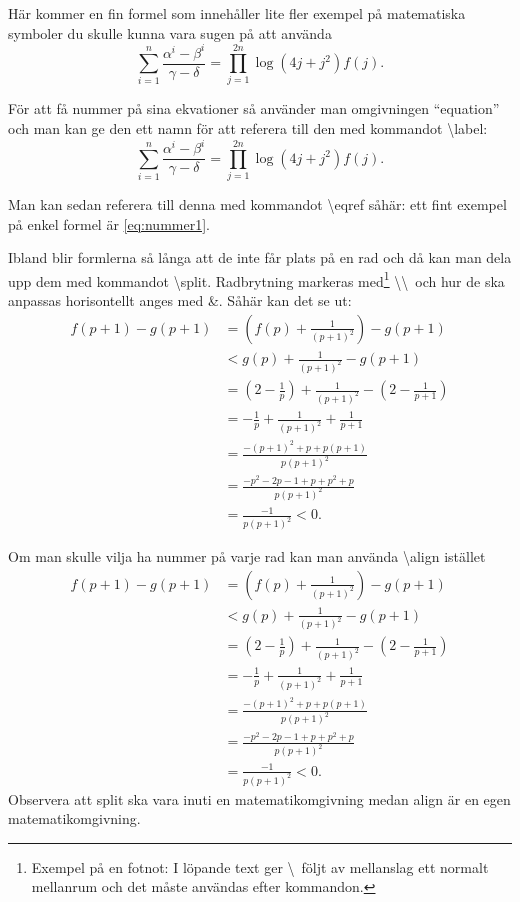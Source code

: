 \documentclass{article}
\begin{document}
Här kommer en fin formel som innehåller lite fler exempel på matematiska
symboler du skulle kunna vara sugen på att använda
\[
\sum_{i=1}^n \frac{\alpha^i-\beta^i}{\gamma - \delta} = \prod_{j=1}^{2n}
\log(4j + j^2) f(j).
\]

För att få nummer på sina ekvationer så använder man omgivningen ``equation''
och man kan ge den ett namn för att referera till den med kommandot 
\textbackslash label:
\begin{equation}
  \label{eq:nummer1}
\sum_{i=1}^n \frac{\alpha^i-\beta^i}{\gamma - \delta} = \prod_{j=1}^{2n}
\log(4j + j^2) f(j).  
\end{equation}

Man kan sedan referera till denna med kommandot \textbackslash eqref såhär:
ett fint exempel på enkel formel är \eqref{eq:nummer1}.

Ibland blir formlerna så långa att de inte får plats på en rad och då kan
man dela upp dem med kommandot \textbackslash split. Radbrytning markeras 
med\footnote{Exempel på en fotnot: 
I löpande text ger \textbackslash\ följt av 
mellanslag ett normalt mellanrum och det måste användas efter kommandon.}
\textbackslash\textbackslash\ och hur de ska anpassas horisontellt anges med
\&. Såhär kan det se ut:
\begin{equation}
  \begin{split}
  f(p+1)-g(p+1) &= \left(f(p)+\frac1{(p+1)^2}\right)-g(p+1) \\
  &< g(p)+\frac1{(p+1)^2}-g(p+1) \\
  &= \left(2-\frac1p\right)+\frac1{(p+1)^2} -\left(2-\frac1{p+1}\right) \\
  &=-\frac1p+\frac1{(p+1)^2}+\frac1{p+1} \\
  &= \frac{-(p+1)^2+p+p(p+1)}{p(p+1)^2} \\
  &= \frac{-p^2-2p-1+p+p^2+p}{p(p+1)^2} \\
  &= \frac{-1}{p(p+1)^2}<0.    
  \end{split}
\end{equation}

Om man skulle vilja ha nummer på varje rad kan man använda \textbackslash align
istället
\begin{align}
  f(p+1)-g(p+1) &= \left(f(p)+\frac1{(p+1)^2}\right)-g(p+1) \\
  &< g(p)+\frac1{(p+1)^2}-g(p+1) \\
  &= \left(2-\frac1p\right)+\frac1{(p+1)^2} -\left(2-\frac1{p+1}\right) \\
  &=-\frac1p+\frac1{(p+1)^2}+\frac1{p+1} \\
  &= \frac{-(p+1)^2+p+p(p+1)}{p(p+1)^2} \\
  &= \frac{-p^2-2p-1+p+p^2+p}{p(p+1)^2} \\
  &= \frac{-1}{p(p+1)^2}<0.    
\end{align}
Observera att split ska vara inuti en matematikomgivning medan align är en 
egen matematikomgivning.


\tableofcontents
\end{document}
